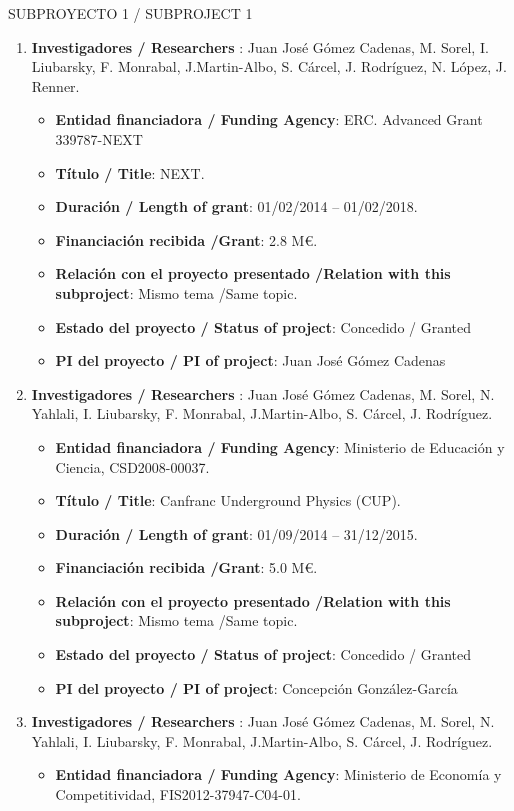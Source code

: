 {\sc SUBPROYECTO 1 / SUBPROJECT 1}

\begin{enumerate}
\item {\bf Investigadores / Researchers }: Juan José Gómez Cadenas, M. Sorel, I. Liubarsky, F. Monrabal, J.Martin-Albo, S. Cárcel, J. Rodríguez, N. López, J. Renner.
\begin{itemize}
\item {\bf Entidad financiadora / Funding Agency}: ERC. Advanced Grant 339787-NEXT 
\item {\bf Título / Title}:  NEXT.
\item {\bf Duración / Length of grant}: 01/02/2014 -- 01/02/2018. 
\item {\bf Financiación recibida /Grant}: 2.8 M\euro. 
\item {\bf Relación con el proyecto presentado /Relation with this subproject}: Mismo tema /Same topic. 
\item {\bf Estado del proyecto / Status of project}: Concedido / Granted
\item {\bf PI del proyecto / PI of project}: Juan José Gómez Cadenas
\end{itemize}
\item {\bf Investigadores / Researchers }: Juan José Gómez Cadenas, M. Sorel, N. Yahlali, I. Liubarsky, F. Monrabal, J.Martin-Albo, S. Cárcel, J. Rodríguez.
\begin{itemize}
\item {\bf Entidad financiadora / Funding Agency}: Ministerio de Educaci\'on y Ciencia, CSD2008-00037.
\item {\bf Título / Title}:  Canfranc Underground Physics (CUP).
\item {\bf Duración / Length of grant}: 01/09/2014 -- 31/12/2015. 
\item {\bf Financiación recibida /Grant}: 5.0 M\euro. 
\item {\bf Relación con el proyecto presentado /Relation with this subproject}: Mismo tema /Same topic. 
\item {\bf Estado del proyecto / Status of project}: Concedido / Granted
\item {\bf PI del proyecto / PI of project}: Concepción González-García 
\end{itemize}
\item {\bf Investigadores / Researchers }: Juan José Gómez Cadenas, M. Sorel, N. Yahlali, I. Liubarsky, F. Monrabal, J.Martin-Albo, S. Cárcel, J. Rodríguez.
\begin{itemize}
\item {\bf Entidad financiadora / Funding Agency}:  Ministerio de Econom\'ia y Competitividad, FIS2012-37947-C04-01.

\end{itemize}
\end{enumerate}
